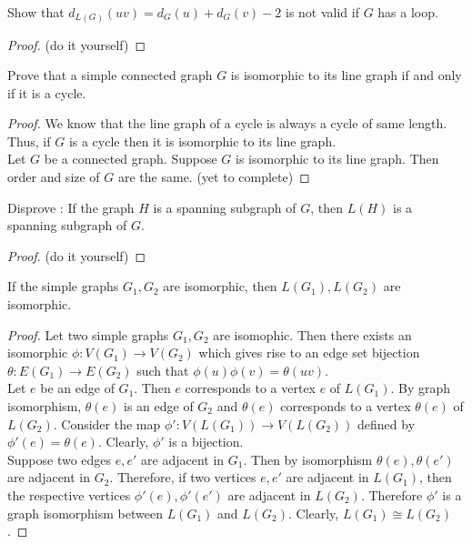 \begin{exercise}
	Show that $d_{L(G)}(uv) = d_G(u) + d_G(v)-2$ is not valid if $G$ has a loop.
\end{exercise}
\begin{proof}
	(do it yourself)
\end{proof}

\begin{exercise}
	Prove that a simple connected graph $G$ is isomorphic to its line graph if and only if it is a cycle.
\end{exercise}
\begin{proof}
	We know that the line graph of a cycle is always a cycle of same length. Thus, if $G$ is a cycle then it is isomorphic to its line graph.\\

	Let $G$ be a connected graph. Suppose $G$ is isomorphic to its line graph. Then order and size of $G$ are the same.  (yet to complete)
\end{proof}

\begin{exercise}
	Disprove : If the graph $H$ is a spanning subgraph of $G$, then $L(H)$ is a spanning subgraph of $G$.
\end{exercise}
\begin{proof}
	(do it yourself)
\end{proof}

\begin{theorem}
	If the simple graphs $G_1,G_2$ are isomorphic, then $L(G_1),L(G_2)$ are isomorphic.
\end{theorem}
\begin{proof}
	Let two simple graphs $G_1,G_2$ are isomophic.
	Then there exists an isomorphic $\phi : V(G_1) \to V(G_2)$ which gives rise to an edge set bijection $\theta : E(G_1) \to E(G_2)$ such that $\phi(u)\phi(v) = \theta(uv)$.\\

	Let $e$ be an edge of $G_1$. Then $e$ corresponds to a vertex $e$ of $L(G_1)$. By graph isomorphism, $\theta(e)$ is an edge of $G_2$ and $\theta(e)$ corresponds to a vertex $\theta(e)$ of $L(G_2)$. Consider the map $\phi' : V(L(G_1)) \to V(L(G_2))$ defined by $\phi'(e) = \theta(e)$. Clearly, $\phi'$ is a bijection.\\

	Suppose two edges $e,e'$ are adjacent in $G_1$. Then by isomorphism $\theta(e),\theta(e')$ are adjacent in $G_2$. Therefore, if two vertices $e,e'$ are adjacent in $L(G_1)$, then the respective vertices $\phi'(e),\phi'(e')$ are adjacent in $L(G_2)$. Therefore $\phi'$ is a graph isomorphism between $L(G_1)$ and $L(G_2)$. Clearly, $L(G_1) \cong L(G_2)$.
\end{proof}

